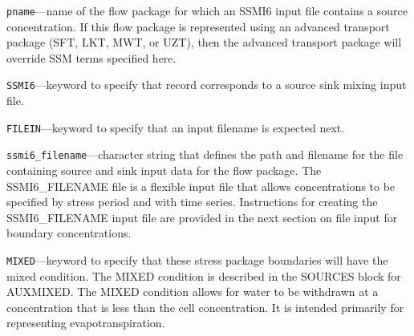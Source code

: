 \begin{description}
\item \texttt{pname}---name of the flow package for which an SSMI6 input file contains a source concentration.  If this flow package is represented using an advanced transport package (SFT, LKT, MWT, or UZT), then the advanced transport package will override SSM terms specified here.

\item \texttt{SSMI6}---keyword to specify that record corresponds to a source sink mixing input file.

\item \texttt{FILEIN}---keyword to specify that an input filename is expected next.

\item \texttt{ssmi6\_filename}---character string that defines the path and filename for the file containing source and sink input data for the flow package. The SSMI6\_FILENAME file is a flexible input file that allows concentrations to be specified by stress period and with time series. Instructions for creating the SSMI6\_FILENAME input file are provided in the next section on file input for boundary concentrations.

\item \texttt{MIXED}---keyword to specify that these stress package boundaries will have the mixed condition.  The MIXED condition is described in the SOURCES block for AUXMIXED.  The MIXED condition allows for water to be withdrawn at a concentration that is less than the cell concentration.  It is intended primarily for representing evapotranspiration.

\end{description}

